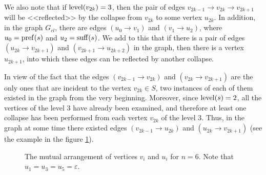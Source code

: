 We also note that if $ \operatorname{level} (v_{2k}) = 3 $, then the pair of edges $ v_{2k-1} \to v_{2k} \to v_{2k + 1} $ will be <<reflected>> by the collapse from $ v_{2k} $ to some vertex $ u_{2k} $. In addition, in the graph $ G_{cl} $, there are edges $ (u_0 \to v_1) $ and $ (v_1 \to u_2) $, where $ u_0 = \operatorname{pref} (s) $ and $ u_2 = \operatorname{suff} (s) $. We add to this that if there is a pair of edges $ (u_{2k} \to v_{2k + 1}) $ and $ (v_{2k + 1} \to u_{2k + 2}) $ in the graph, then there is a vertex $ u_{2k + 1} $, into which these edges can be reflected by another collapse.

In view of the fact that the edges $ (v_{2k-1} \to v_{2k}) $ and $ (v_{2k} \to v_{2k + 1}) $ are the only ones that are incident to the vertex $ v_{2k} \in S $, two instances of each of them existed in the graph from the very beginning. Moreover, since $ \operatorname{level} (s) = 2 $, all the vertices of the level $ 3 $ have already been examined, and therefore at least one collapse has been performed from each vertex $ v_ {2k} $ of the level $ 3 $. Thus, in the graph at some time there existed edges $ (v_{2k-1} \to u_{2k}) $ and $ (u_{2k} \to v_{2k + 1}) $ (see the example in the figure \ref {fig:lvl2pathuv}).

\begin{figure}[ht]
\begin{center}

\end{center}

\caption{The mutual arrangement of vertices $ v_i $ and $ u_i $ for $ n = 6 $. Note that $u_1=u_3=u_5=\varepsilon$.}\label{fig:lvl2pathuv}
\end{figure}

